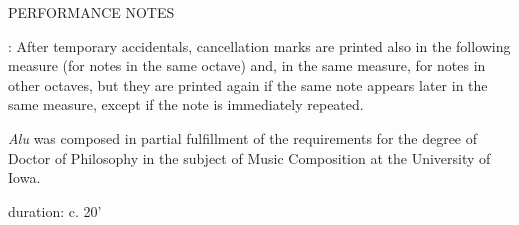 \documentclass[11pt]{article}
\begin{document}
\vspace*{1.25\baselineskip}

\begin{center}
\huge PERFORMANCE NOTES
\end{center}
\begingroup
\begin{center}

 : After temporary accidentals, cancellation marks are printed also in the following measure (for notes in the same octave) and, in the same measure, for notes in other octaves, but they are printed again if the same note appears later in the same measure, except if the note is immediately repeated.
\rightskip\leftskip
\phantom{text} \hfill \phantom{()}


\end{center}
\endgroup

\vspace*{9\baselineskip}

\begin{center}
\textit{Alu} was composed in partial fulfillment of the requirements for the degree of Doctor of Philosophy in the subject of Music Composition at the University of Iowa.
\end{center}

\vspace*{23\baselineskip}

\begin{center}
duration: c. 20'
\end{center}
\end{document}

